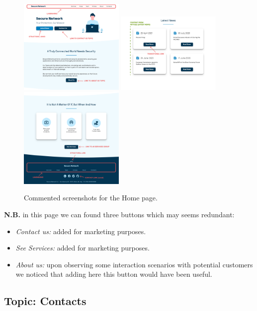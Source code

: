 \documentclass[12pt]{report}
\begin{document}
\begin{figure}[H]
	\centering
	\includegraphics[width=0.45\textwidth]{high_fid_wireframes/home/1.png}
	\includegraphics[width=0.45\textwidth]{high_fid_wireframes/home/2.png}
	\includegraphics[width=0.45\textwidth]{high_fid_wireframes/home/3.png}
	\caption{Commented screenshots for the Home page.}
\end{figure}
\textbf{N.B.} in this page we can found three buttons which may seems redundant:
\begin{itemize}
	\item \emph{Contact us:} added for marketing purposes.
	\item \emph{See Services:} added for marketing purposes.
	\item \emph{About us:} upon observing some interaction scenarios with 
	potential customers we noticed that adding here this button would have been useful.
\end{itemize}
\subsection{Topic: Contacts}
\end{document}
